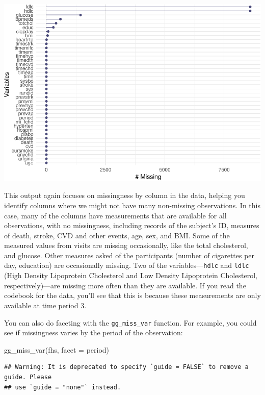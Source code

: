 \documentclass[
]{book}
\newenvironment{Shaded}{\begin{snugshade}}{\end{snugshade}}
\newcommand{\AttributeTok}[1]{\textcolor[rgb]{0.77,0.63,0.00}{#1}}
\newcommand{\FunctionTok}[1]{\textcolor[rgb]{0.00,0.00,0.00}{#1}}
\newcommand{\NormalTok}[1]{#1}
\begin{document}
\includegraphics{adv_epi_analysis_files/figure-latex/unnamed-chunk-174-1.pdf}

This output again focuses on missingness by column in the data, helping you identify columns where we might not have many non-missing observations.
In this case, many of the columns have measurements that are available for all observations, with no missingness,
including records of the subject's ID, measures of death, stroke, CVD and other
events, age, sex, and BMI. Some of the measured values from visits are missing
occasionally, like the total cholesterol, and glucose. Other measures asked of
the participants (number of cigarettes per day, education) are occasionally
missing. Two of the variables---\texttt{hdlc} and \texttt{ldlc} (High Density Lipoprotein Cholesterol and Low Density Lipoprotein Cholesterol, respectively)---are missing more often than
they are available. If you read the codebook for the data, you'll see that this is because these measurements are only available at time period 3.

You can also do faceting with the \texttt{gg\_miss\_var} function. For
example, you could see if missingness varies by the period of the observation:

\begin{Shaded}
\begin{Highlighting}[]
\FunctionTok{gg\_miss\_var}\NormalTok{(fhs, }\AttributeTok{facet =}\NormalTok{ period)}
\end{Highlighting}
\end{Shaded}

\begin{verbatim}
## Warning: It is deprecated to specify `guide = FALSE` to remove a guide. Please
## use `guide = "none"` instead.
\end{verbatim}
\end{document}
